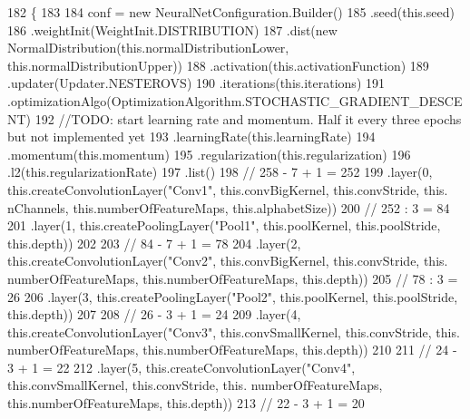 \begin{DoxyCode}
182                                            \{
183         
184         conf = \textcolor{keyword}{new} NeuralNetConfiguration.Builder()
185                 .seed(this.seed)
186                 .weightInit(WeightInit.DISTRIBUTION)
187                 .dist(\textcolor{keyword}{new} NormalDistribution(this.normalDistributionLower, this.normalDistributionUpper))
188                 .activation(this.activationFunction)
189                 .updater(Updater.NESTEROVS)
190                 .iterations(this.iterations)
191                 .optimizationAlgo(OptimizationAlgorithm.STOCHASTIC\_GRADIENT\_DESCENT)
192                 \textcolor{comment}{//TODO: start learning rate and momentum. Half it every three epochs but not implemented
       yet}
193                 .learningRate(this.learningRate)
194                 .momentum(this.momentum)
195                 .regularization(this.regularization)
196                 .l2(this.regularizationRate)
197                 .list()
198                 \textcolor{comment}{// 258 - 7 + 1 = 252}
199                 .layer(0, this.createConvolutionLayer(\textcolor{stringliteral}{"Conv1"}, this.convBigKernel, this.convStride, this.
      nChannels, this.numberOfFeatureMaps, this.alphabetSize))
200                 \textcolor{comment}{// 252 : 3 = 84}
201                 .layer(1, this.createPoolingLayer(\textcolor{stringliteral}{"Pool1"}, this.poolKernel, this.poolStride, this.depth))
202                 
203                 \textcolor{comment}{// 84 - 7 + 1 = 78}
204                 .layer(2, this.createConvolutionLayer(\textcolor{stringliteral}{"Conv2"}, this.convBigKernel, this.convStride, this.
      numberOfFeatureMaps, this.numberOfFeatureMaps, this.depth))
205                 \textcolor{comment}{// 78 : 3 = 26}
206                 .layer(3, this.createPoolingLayer(\textcolor{stringliteral}{"Pool2"}, this.poolKernel, this.poolStride, this.depth))
207                 
208                 \textcolor{comment}{// 26 - 3 + 1 = 24}
209                 .layer(4, this.createConvolutionLayer(\textcolor{stringliteral}{"Conv3"}, this.convSmallKernel, this.convStride, this.
      numberOfFeatureMaps, this.numberOfFeatureMaps, this.depth))
210                 
211                 \textcolor{comment}{// 24 - 3 + 1 = 22}
212                 .layer(5, this.createConvolutionLayer(\textcolor{stringliteral}{"Conv4"}, this.convSmallKernel, this.convStride, this.
      numberOfFeatureMaps, this.numberOfFeatureMaps, this.depth))
213                 \textcolor{comment}{// 22 - 3 + 1 = 20}

\end{DoxyCode}

